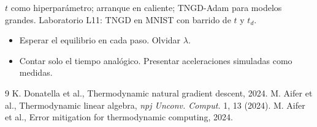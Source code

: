 \documentclass[11pt,a4paper]{article}
\begin{document}
\begin{aplicacion}
$t$ como hiperparámetro; arranque en caliente; TNGD-Adam para modelos grandes. Laboratorio L11: TNGD en MNIST con barrido de $t$ y $t_d$.
\end{aplicacion}

\begin{error}
\begin{itemize}[nosep]
\item Esperar el equilibrio en cada paso. \quad Olvidar $\lambda$.
\item Contar solo el tiempo analógico. \quad Presentar aceleraciones simuladas como medidas.
\end{itemize}
\end{error}

\begin{thebibliography}{9}\small
{} K. Donatella et al., Thermodynamic natural gradient descent, 2024.
 M. Aifer et al., Thermodynamic linear algebra, \emph{npj Unconv. Comput.} 1, 13 (2024).
 M. Aifer et al., Error mitigation for thermodynamic computing, 2024.
\end{thebibliography}
\end{document}

